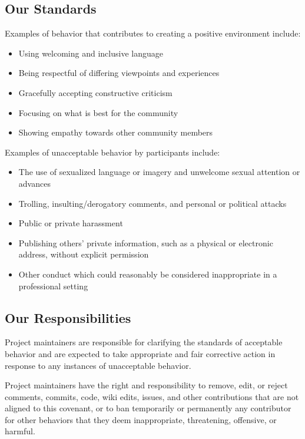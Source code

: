 \subsection{Our Standards}\label{our-standards}

Examples of behavior that contributes to creating a positive environment
include:

\begin{itemize}
\item
  Using welcoming and inclusive language
\item
  Being respectful of differing viewpoints and experiences
\item
  Gracefully accepting constructive criticism
\item
  Focusing on what is best for the community
\item
  Showing empathy towards other community members
\end{itemize}

Examples of unacceptable behavior by participants include:

\begin{itemize}
\item
  The use of sexualized language or imagery and unwelcome sexual
  attention or advances
\item
  Trolling, insulting/derogatory comments, and personal or political
  attacks
\item
  Public or private harassment
\item
  Publishing others' private information, such as a physical or
  electronic address, without explicit permission
\item
  Other conduct which could reasonably be considered inappropriate in
  a professional setting
\end{itemize}

\subsection{Our Responsibilities}\label{our-responsibilities}

Project maintainers are responsible for clarifying the standards of
acceptable behavior and are expected to take appropriate and fair
corrective action in response to any instances of unacceptable behavior.

Project maintainers have the right and responsibility to remove, edit,
or reject comments, commits, code, wiki edits, issues, and other
contributions that are not aligned to this covenant, or to ban
temporarily or permanently any contributor for other behaviors that they
deem inappropriate, threatening, offensive, or harmful.

